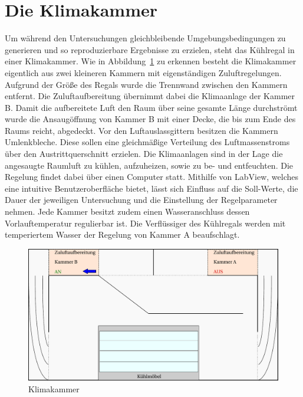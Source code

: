 \section{Die Klimakammer}
\label{sec:Die Klimakammer}

Um während den Untersuchungen gleichbleibende Umgebungsbedingungen zu generieren und so reproduzierbare Ergebnisse zu erzielen, steht das Kühlregal in einer Klimakammer.
Wie in Abbildung~\ref{fig:Klimakammer} zu erkennen besteht die Klimakammer eigentlich aus zwei kleineren Kammern mit eigenständigen Zuluftregelungen. Aufgrund der Größe des Regals wurde die Trennwand zwischen den Kammern entfernt. Die Zuluftaufbereitung übernimmt dabei die Klimaanlage der Kammer B. Damit die aufbereitete Luft den Raum über seine gesamte Länge durchströmt wurde die Ansaugöffnung von Kammer B mit einer Decke, die bis zum Ende des Raums reicht, abgedeckt. Vor den Luftauslassgittern besitzen die Kammern Umlenkbleche. Diese sollen eine gleichmäßige Verteilung des Luftmassenstroms über den Austrittquerschnitt erzielen. Die Klimaanlagen sind in der Lage die angesaugte Raumluft zu kühlen, aufzuheizen, sowie zu be- und entfeuchten. Die Regelung findet dabei über einen Computer statt. Mithilfe von LabView, welches eine intuitive Benutzeroberfläche bietet, lässt sich Einfluss auf die Soll-Werte, die Dauer der jeweiligen Untersuchung und die Einstellung der Regelparameter nehmen. 
Jede Kammer besitzt zudem einen Wasseranschluss dessen Vorlauftemperatur regulierbar ist.
Die Verflüssiger des Kühlregals werden mit temperiertem Wasser der Regelung von Kammer A beaufschlagt. 


\begin{figure}[htb]
\centering
\includegraphics[scale=.5]{Pictures/ClimateChamber.pdf}
\caption{Klimakammer}
\label{fig:Klimakammer}
\end{figure}

